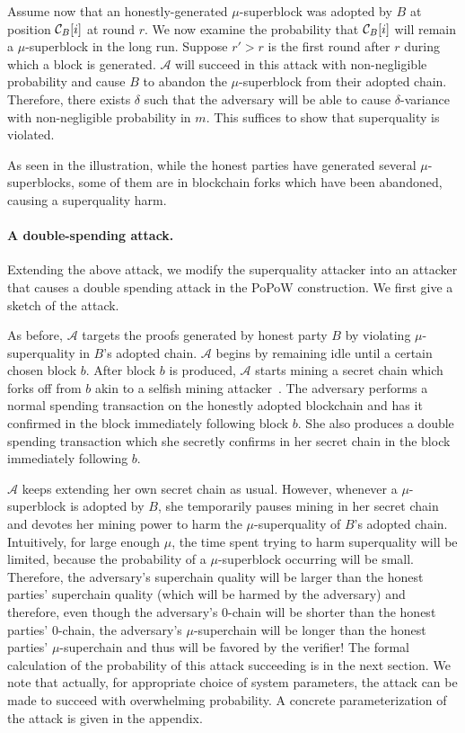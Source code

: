 Assume now that an honestly-generated $\mu$-superblock was adopted by $B$ at
position $\mathcal{C}_B[i]$ at round $r$. We now examine the probability that
$\mathcal{C}_B[i]$ will remain a $\mu$-superblock in the long run. Suppose $r' > r$
is the first round after $r$ during which a block is generated. $\mathcal{A}$
will succeed in this attack with non-negligible probability and cause $B$ to
abandon the $\mu$-superblock from their adopted chain. Therefore, there
exists $\delta$ such that the adversary will be able to cause $\delta$-variance
with non-negligible probability in $m$. This suffices to show that superquality
is violated.

As seen in the illustration, while the honest parties have generated several
$\mu$-superblocks, some of them are in blockchain forks which have been
abandoned, causing a superquality harm.

\paragraph{A double-spending attack.}
Extending the above attack, we modify the superquality attacker into an attacker
that causes a double spending attack in the PoPoW construction. We first give
a sketch of the attack.

As before, $\mathcal{A}$ targets the proofs generated by honest party $B$ by
violating $\mu$-superquality in $B$'s adopted chain. $\mathcal{A}$ begins by
remaining idle until a certain chosen block $b$. After block $b$ is produced,
$\mathcal{A}$ starts mining a secret chain which forks off from $b$ akin to a
selfish mining attacker~\cite{selfish}. The adversary performs a normal spending
transaction on the honestly adopted blockchain and has it confirmed in the block
immediately following block $b$. She also produces a double spending transaction
which she secretly confirms in her secret chain in the block immediately
following $b$.

$\mathcal{A}$ keeps extending her own secret chain as usual. However, whenever a
$\mu$-superblock is adopted by $B$, she temporarily pauses mining in her secret
chain and devotes her mining power to harm the $\mu$-superquality of $B$'s
adopted chain. Intuitively, for large enough $\mu$, the time spent trying to
harm superquality will be limited, because the probability of a $\mu$-superblock
occurring will be small. Therefore, the adversary's superchain quality will be
larger than the honest parties' superchain quality (which will be harmed by the
adversary) and therefore, even though the adversary's $0$-chain will be shorter
than the honest parties' $0$-chain, the adversary's $\mu$-superchain will be
longer than the honest parties' $\mu$-superchain and thus will be favored by the
verifier! The formal calculation of the probability of this attack succeeding is
in the next section. We note that  actually, for appropriate choice of system
parameters, the attack can be made to succeed with overwhelming probability.
A concrete parameterization of the attack is given in the
appendix.

